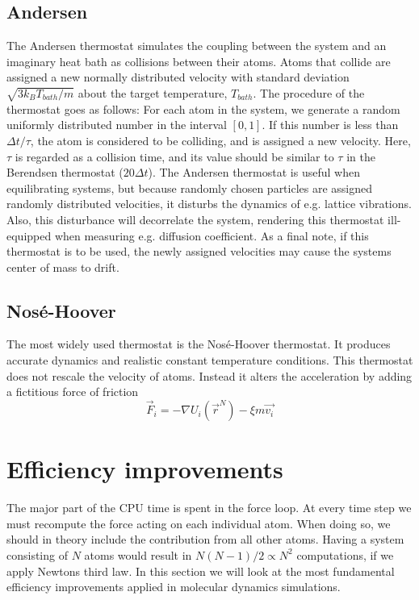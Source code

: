 \documentclass[twoside,english]{uiofysmaster}
\begin{document}
\subsection{Andersen}
The Andersen thermostat simulates the coupling between the system and an imaginary heat bath as collisions between their atoms. 
Atoms that collide are assigned a new normally distributed velocity with standard deviation  $\sqrt{3k_BT_{bath}/m}$ about the target temperature, $T_{bath}$.
The procedure of the thermostat goes as follows:
For each atom in the system, we generate a random uniformly distributed number in the interval $[0,1]$. 
If this number is less than $\Delta t/\tau$, the atom is considered to be colliding, and is assigned a new velocity. 
Here, $\tau$ is regarded as a collision time, and its value should be similar to $\tau$ in the Berendsen thermostat ($20\Delta t$). 
The Andersen thermostat is useful when equilibrating systems, but because randomly chosen particles are assigned randomly distributed velocities, it disturbs the dynamics of e.g. lattice vibrations. 
Also, this disturbance will decorrelate the system, rendering this thermostat ill-equipped when measuring e.g. diffusion coefficient.  
As a final note, if this thermostat is to be used, the newly assigned velocities may cause the systems center of mass to drift.


\subsection{Nosé-Hoover}
The most widely used thermostat is the Nosé-Hoover thermostat. 
It produces  accurate dynamics and realistic constant temperature conditions. 
This thermostat does not rescale the velocity of atoms. 
Instead it alters the acceleration by adding a fictitious force of friction 
\begin{equation}
	\vec{F}_i = -\nabla U_i(\vec{r}^N) -\xi m\vec{v_i} 
\end{equation}    


\section{Efficiency improvements}
The major part of the CPU time is spent in the force loop. 
At every time step we must recompute the force acting on each individual atom. 
When doing so, we should in theory include the contribution from all other atoms. 
Having a system consisting of $N$ atoms would result in $N(N-1)/2 \propto N^2$ computations, if we apply Newtons third law.
In this section we will look at the most fundamental efficiency improvements applied in molecular dynamics simulations.
\end{document}

